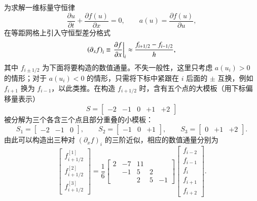 为求解一维标量守恒律
\begin{equation}
\frac{\partial u}{\partial t}+\frac{\partial f(u)}{\partial x}=0,\qquad a(u)=\frac{\partial f(u)}{\partial u},
\end{equation}
在等距网格上引入守恒型差分格式
\begin{equation}
\left(\partial_{x}f\right)_{i}\equiv\eval{\pdv{f}{x}}_{i}\approx\frac{f_{i+1/2}-f_{i-1/2}}{h},
\end{equation}
其中 $f_{i\pm1/2}$ 为下面将要构造的数值通量。不失一般性，这里只考虑
$a(u_{i})>0$ 的情形；对于 $a(u_{i})<0$ 的情形，只需将下标中紧跟在 $i$ 后面的 $\pm$ 互换，例如
$f_{i+1}$ 换为 $f_{i-1}$，以此类推。在构造 $f_{i+1/2}$ 时，含有五个点的大模板（用下标偏移量表示）
\begin{equation}
S=\begin{bmatrix}-2 & -1 & 0 & +1 & +2\end{bmatrix}
\end{equation}
被分解为三个各含三个点且部分重叠的小模板：
\begin{equation}
S_{1}=\begin{bmatrix}-2 & -1 & 0\end{bmatrix},\qquad S_{2}=\begin{bmatrix}-1 & 0 & +1\end{bmatrix},\qquad S_{3}=\begin{bmatrix}0 & +1 & +2\end{bmatrix}.
\end{equation}
由此可以构造出三种对 $\left(\partial_{x}f\right)_{i}$ 的三阶近似，相应的数值通量分别为
\begin{equation}
\begin{bmatrix}f_{i+1/2}^{[1]}\\
f_{i+1/2}^{[2]}\\
f_{i+1/2}^{[3]}
\end{bmatrix}=\frac{1}{6}\begin{bmatrix}2 & -7 & 11\\
 & -1 & 5 & 2\\
 &  & 2 & 5 & -1
\end{bmatrix}\begin{bmatrix}f_{i-2}\\
f_{i-1}\\
f_{i}\\
f_{i+1}\\
f_{i+2}
\end{bmatrix}.
\end{equation}
